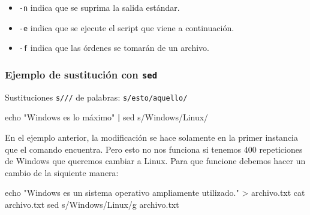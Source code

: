 \documentclass[
  spanish,
  12pt,
  letterpaper,
  DIV=11,
  numbers=noendperiod]{scrreprt}
\newenvironment{Shaded}{\begin{snugshade}}{\end{snugshade}}
\newcommand{\BuiltInTok}[1]{\textcolor[rgb]{0.00,0.23,0.31}{#1}}
\newcommand{\FunctionTok}[1]{\textcolor[rgb]{0.28,0.35,0.67}{#1}}
\newcommand{\KeywordTok}[1]{\textcolor[rgb]{0.00,0.23,0.31}{\textbf{#1}}}
\newcommand{\NormalTok}[1]{\textcolor[rgb]{0.00,0.23,0.31}{#1}}
\newcommand{\OperatorTok}[1]{\textcolor[rgb]{0.37,0.37,0.37}{#1}}
\newcommand{\StringTok}[1]{\textcolor[rgb]{0.13,0.47,0.30}{#1}}
\providecommand{\tightlist}{%
  \setlength{\itemsep}{0pt}\setlength{\parskip}{0pt}}
\begin{document}
\begin{tcolorbox}[enhanced jigsaw, arc=.35mm, bottomrule=.15mm, bottomtitle=1mm, breakable, colback=white, colbacktitle=quarto-callout-note-color!10!white, colframe=quarto-callout-note-color-frame, coltitle=black, left=2mm, leftrule=.75mm, opacityback=0, opacitybacktitle=0.6, rightrule=.15mm, title={Explicación}, titlerule=0mm, toprule=.15mm, toptitle=1mm]

\begin{itemize}
\tightlist
\item
  \texttt{-n} indica que se suprima la salida estándar.
\item
  \texttt{-e} indica que se ejecute el script que viene a continuación.
\item
  \texttt{-f} indica que las órdenes se tomarán de un archivo.
\end{itemize}

\end{tcolorbox}

\subsubsection{\texorpdfstring{Ejemplo de sustitución con
\texttt{sed}}{Ejemplo de sustitución con sed}}\label{ejemplo-de-sustituciuxf3n-con-sed}

Sustituciones \texttt{s///} de palabras: \texttt{s/esto/aquello/}

\begin{Shaded}
\begin{Highlighting}[]
\BuiltInTok{echo} \StringTok{"Windows es lo máximo"} \KeywordTok{|} \FunctionTok{sed} \StringTok{\textquotesingle{}s/Windows/Linux/\textquotesingle{}}
\end{Highlighting}
\end{Shaded}

En el ejemplo anterior, la modificación se hace solamente en la primer
instancia que el comando encuentra. Pero esto no nos funciona si tenemos
400 repeticiones de Windows que queremos cambiar a Linux. Para que
funcione debemos hacer un cambio de la siquiente manera:

\begin{Shaded}
\begin{Highlighting}[]
\BuiltInTok{echo} \StringTok{"Windows es un sistema operativo ampliamente utilizado."} \OperatorTok{\textgreater{}}\NormalTok{ archivo.txt}
\FunctionTok{cat}\NormalTok{ archivo.txt}
\FunctionTok{sed} \StringTok{\textquotesingle{}s/Windows/Linux/g\textquotesingle{}}\NormalTok{ archivo.txt}
\end{Highlighting}
\end{Shaded}
\end{document}
